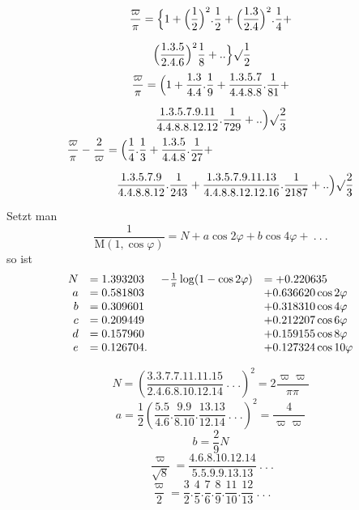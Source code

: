 \begingroup
\renewcommand{\arraystretch}{1.45}
\[
\begin{aligned}\frac{\varpi}{\pi}&=\Bigl\{1+\Bigl(\frac12\Bigr)^2.\frac12+
\Bigl(\frac{1.3}{2.4}\Bigr)^2.\frac14+
\\[7pt]&\quad{}\Bigl(\frac{1.3.5}{2.4.6}\Bigr)^2\frac18+..\Bigr\}\surd {\frac12}\end{aligned}
\]
\[
\begin{aligned}\frac{\varpi}{\pi}&=\Bigl(1+\frac{1.3}{4.4}.\frac19+
\frac{1.3.5.7}{4.4.8.8}.\frac1{81}+
\\[7pt]&\quad{}\frac{1.3.5.7.9.11}{4.4.8.8.12.12}.\frac1{729}+..\Bigr)\surd {\frac23}\end{aligned}
\]
\[
\begin{aligned}\frac{\varpi}{\pi}-\frac2{\varpi}&=\Bigl(\frac14.\frac13+\frac{1.3.5}{4.4.8}.\frac1{27}+
\\[7pt]&\quad{}\frac{1.3.5.7.9}{4.4.8.8.12}.\frac1{243}+
\frac{1.3.5.7.9.11.13}{4.4.8.8.12.12.16}.\frac1{2187}+..\Bigr)\surd {\frac23}\end{aligned}
\]

Setzt man
\[
\frac1{\mathrm M(1,\cos\varphi)}=N+a\cos2\varphi+b\cos4\varphi+\ .\ .\ .
\]
so ist
\begingroup\small\[
\begin{array}{rl@{\hspace{12pt}}rl}
N&=1.393203&-\frac1\pi\log(1-\cos2\varphi)&=+0.220635\\
a&=0.581803&&+0.636620\cos2\varphi\\
b&=0.309601&&+0.318310\cos4\varphi\\
c&=0.209449&&+0.212207\cos6\varphi\\
d&=0.157960&&+0.159155\cos8\varphi\\
e&=0.126704.&&+0.127324\cos10\varphi
\end{array}
\]\endgroup


\[
N=\left(\frac{3.3.7.7.11.11.15}{2.4.6.8.10.12.14}\ .\ .\ .\right)^2
=2\frac{\varpi\varpi}{\pi\pi}
\]
\[
a=\frac12\left(\frac{5.5}{4.6}.\frac{9.9}{8.10}.\frac{13.13}{12.14}\ .\ .\ .\right)^2
=\frac4{\varpi\varpi}
\]
\[
b=\frac29N
\]
\[
\frac{\varpi}{\surd 8}=\frac{4.6.8.10.12.14}{5.5.9.9.13.13}\ .\ .\ .
\]
\[
\frac{\varpi}{2}=\frac32.\frac45.\frac76.\frac89.\frac{11}{10}.\frac{12}{13}\ .\ .\ .
\]

\clearpage
\endgroup
